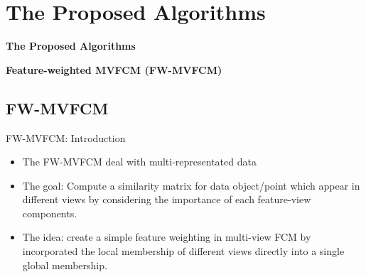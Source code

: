 \documentclass[compress,sky blue]{beamer}
\begin{document}


\section{The Proposed Algorithms}


\begin{frame}{}
    \centering
    \Huge{\textbf{The Proposed Algorithms}}
\end{frame}


\begin{frame}{}
    \centering
\Huge{\textbf{Feature-weighted MVFCM (FW-MVFCM)}}
\end{frame}

\subsection{FW-MVFCM }


\begin{frame}{FW-MVFCM: Introduction}
	\vspace{-0.3cm}	
   
   \begin{itemize}
   \item    The FW-MVFCM deal with multi-representated data 
\item The goal: Compute a similarity matrix for data object/point which appear in different views by considering the importance of each feature-view components.
\item The idea: create a simple feature weighting in multi-view FCM by incorporated the local membership of different views directly into a single global membership. 
   \end{itemize}
        

\end{frame}

\end{document}
